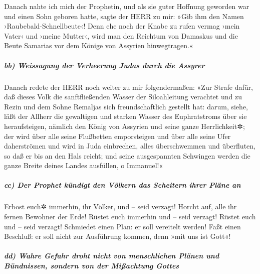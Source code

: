 Danach nahte ich mich der Prophetin, und als sie guter
Hoffnung geworden war und einen Sohn geboren hatte, sagte der HERR zu
mir: »Gib ihm den Namen ›Raubebald-Schnellbeute‹! Denn ehe
noch der Knabe zu rufen vermag ›mein Vater‹ und ›meine Mutter‹, wird man
den Reichtum von Damaskus und die Beute Samarias vor dem Könige von
Assyrien hinwegtragen.«

\hypertarget{bb-weissagung-der-verheerung-judas-durch-die-assyrer}{%
\subparagraph{bb) Weissagung der Verheerung Judas durch die
Assyrer}\label{bb-weissagung-der-verheerung-judas-durch-die-assyrer}}

Danach redete der HERR noch weiter zu mir folgendermaßen:
»Zur Strafe dafür, daß dieses Volk die sanftfließenden
Wasser der Siloahleitung verachtet und zu Rezin und dem Sohne Remaljas
sich freundschaftlich gestellt hat: darum, siehe, läßt der
Allherr die gewaltigen und starken Wasser des Euphratstroms über sie
heraufsteigen, nämlich den König von Assyrien und seine ganze
Herrlichkeit✲; der wird über alle seine Flußbetten emporsteigen und über
alle seine Ufer daherströmen und wird in Juda einbrechen,
alles überschwemmen und überfluten, so daß er bis an den Hals reicht;
und seine ausgespannten Schwingen werden die ganze Breite deines Landes
ausfüllen, o Immanuel!«

\hypertarget{cc-der-prophet-kuxfcndigt-den-vuxf6lkern-das-scheitern-ihrer-pluxe4ne-an}{%
\subparagraph{cc) Der Prophet kündigt den Völkern das Scheitern ihrer
Pläne
an}\label{cc-der-prophet-kuxfcndigt-den-vuxf6lkern-das-scheitern-ihrer-pluxe4ne-an}}

Erbost euch✲ immerhin, ihr Völker, und -- seid verzagt!
Horcht auf, alle ihr fernen Bewohner der Erde! Rüstet euch immerhin und
-- seid verzagt! Rüstet euch und -- seid verzagt!
Schmiedet einen Plan: er soll vereitelt werden! Faßt
einen Beschluß: er soll nicht zur Ausführung kommen, denn »mit uns ist
Gott«!

\hypertarget{dd-wahre-gefahr-droht-nicht-von-menschlichen-pluxe4nen-und-buxfcndnissen-sondern-von-der-miuxdfachtung-gottes}{%
\subparagraph{dd) Wahre Gefahr droht nicht von menschlichen Plänen und
Bündnissen, sondern von der Mißachtung
Gottes}\label{dd-wahre-gefahr-droht-nicht-von-menschlichen-pluxe4nen-und-buxfcndnissen-sondern-von-der-miuxdfachtung-gottes}}

